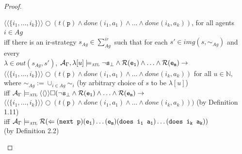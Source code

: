 \documentclass{article}
\theoremstyle{theorem}
\theoremstyle{lemma}
\theoremstyle{definition}
\theoremstyle{remark}
\begin{document}
\begin{proof}
\begin{tabbing}
    \>\>\> $\langle \langle \{i_1,\ldots ,i_k\} \rangle \rangle \bigcirc (t(\texttt{p}) \wedge done(i_1,a_1) \wedge \ldots \wedge done(i_k,a_k))$, for all agents $i \in Ag$ \\
    \>\> iff there is an ir-strategy $s_{Ag} \in \sum_{Ag}^{ir}$ such that for each $s' \in img(s, \sim_{Ag})$ and every \\
    \>\>\> $\lambda \in out(s_{Ag}, s')$, $\mathcal{A}_\Gamma, \lambda[u] \models_\textsc{atl} \neg \texttt{s}_\bot \wedge \mathcal{R}(\texttt{e}_\texttt{1}) \wedge \ldots \wedge \mathcal{R}(\texttt{e}_\texttt{m}) \rightarrow $ \\
    \>\>\> $\langle \langle \{i_1,\ldots ,i_k\} \rangle \rangle \bigcirc (t(\texttt{p}) \wedge done(i_1,a_1) \wedge \ldots \wedge done(i_k,a_k))$ for all $u \in \mathbb{N}$, \\
    \>\>\> where $\sim_{Ag}:= \cup_{i \in Ag} \sim_i$ (by arbitrary choice of $s$ to be $\lambda[u]$)\\
    \>\> iff $\mathcal{A}_\Gamma \models_\textsc{atl} \langle \langle \rangle \rangle \square (\neg \texttt{s}_\bot \wedge \mathcal{R}(\texttt{e}_\texttt{1}) \wedge \ldots \wedge \mathcal{R}(\texttt{e}_\texttt{m}) \rightarrow $ \\
    \>\>\> $\langle \langle \{i_1,\ldots ,i_k\} \rangle \rangle \bigcirc (t(\texttt{p}) \wedge done(i_1,a_1) \wedge \ldots \wedge done(i_k,a_k)))$ (by Definition 1.11) \\
    \>\> iff $\mathcal{A}_\Gamma \models_\textsc{atl} \mathcal{R}(\Leftarrow(\texttt{next p}) (\texttt{e}_\texttt{1}) \ldots(\texttt{e}_\texttt{m})(\texttt{does i\textsubscript{1} a\textsubscript{1}}) \ldots(\texttt{does i\textsubscript{k} a\textsubscript{k}}))$ \\
    \>\>\> (by Definition 2.2)
    \end{tabbing}

\end{proof}
\end{document}
